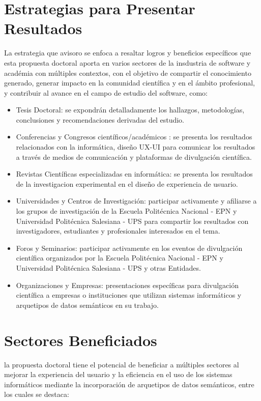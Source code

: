 \documentclass[12pt,a4paper]{article}
\begin{document}
\section{Estrategias para Presentar Resultados}
La estrategia que avisoro se enfoca a resaltar logros y beneficios específicos que esta propuesta doctoral aporta en varios sectores de la insdustria de software y académia con múltiples contextos, con el objetivo de compartir el conocimiento generado, generar impacto en la comunidad científica y en el ámbito profesional, y contribuir al avance en el campo de estudio del software, como:

\begin{itemize}
  \item Tesis Doctoral: se expondrán detalladamente los hallazgos, metodologías, conclusiones y recomendaciones derivadas del estudio.
  \item Conferencias y Congresos científicos/académicos : se presenta los resultados relacionados con la informática, diseño UX-UI para comunicar los resultados a través de medios de comunicación y plataformas de divulgación científica.
  \item Revistas Científicas especializadas en informática: se presenta los resultados de la investigacion experimental en el diseño de experiencia de usuario.
  \item Universidades y Centros de Investigación: participar activamente y afiliarse a los grupos de investigación de la Escuela Politécnica Nacional - EPN y Universidad Politécnica Salesiana - UPS para compartir los resultados con investigadores, estudiantes y profesionales interesados en el tema.
  \item Foros y Seminarios: participar activamente en los eventos de divulgación científica organizados por la Escuela Politécnica Nacional - EPN y Universidad Politécnica Salesiana - UPS y otras Entidades.
  \item Organizaciones y Empresas: presentaciones específicas para divulgación científica a empresas o instituciones que utilizan sistemas informáticos y arquetipos de datos semánticos en su trabajo.
\end{itemize}

\section{Sectores Beneficiados}
la propuesta doctoral tiene el potencial de beneficiar a múltiples sectores al mejorar la experiencia del usuario y la eficiencia en el uso de los sistemas informáticos mediante la incorporación de arquetipos de datos semánticos, entre los cuales se destaca:
\end{document}
